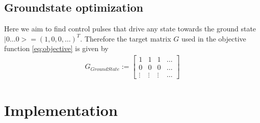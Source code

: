 \documentclass[letterpaper]{article}
\begin{document}
\subsection{Groundstate optimization}
Here we aim to find control pulses that drive any state towards the ground state $|0\dots 0> = (1, 0, 0, \dots )^T$. Therefore the target matrix $G$ used in the objective function \eqref{eq:objective} is given by 
\begin{align}
      G_{GroundState} := \begin{bmatrix} 1      & 1  &  1 & \dots   \\ 
                                         0      & 0 &   0  & \dots  \\ 
                                         \vdots & \vdots & \vdots &  \dots 
                    \end{bmatrix}
\end{align}

\section{Implementation}
\end{document}
